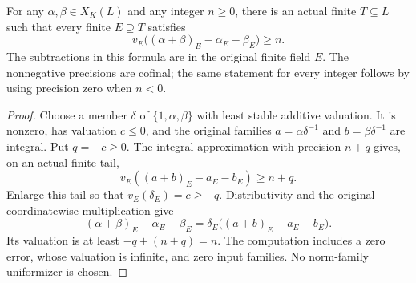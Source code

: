 \begin{lemma}
\label{fw:norm-limit-coordinate-approximation}
\leanok
For any $\alpha,\beta\in X_K(L)$ and any integer $n\geq0$, there is an
actual finite $T\subseteq L$ such that every finite $E\supseteq T$
satisfies
\[
 v_E\bigl((\alpha+\beta)_E-\alpha_E-\beta_E\bigr)\geq n.
\]
The subtractions in this formula are in the original finite field $E$.
The nonnegative precisions are cofinal; the same statement for every integer
follows by using precision zero when $n<0$.
\end{lemma}
\begin{proof}
Choose a member $\delta$ of $\{1,\alpha,\beta\}$ with least
stable additive valuation. It is nonzero, has valuation $c\leq0$,
and the original families $a=\alpha\delta^{-1}$ and
$b=\beta\delta^{-1}$ are integral. Put $q=-c\geq0$.
The integral approximation with precision $n+q$ gives, on an
actual finite tail,
\[
 v_E((a+b)_E-a_E-b_E)\geq n+q.
\]
Enlarge this tail so that $v_E(\delta_E)=c\geq-q$.
Distributivity and the original coordinatewise multiplication give
\[
 (\alpha+\beta)_E-\alpha_E-\beta_E
 =\delta_E\bigl((a+b)_E-a_E-b_E\bigr).
\]
Its valuation is at least $-q+(n+q)=n$. The computation includes a
zero error, whose valuation is infinite, and zero input families.
No norm-family uniformizer is chosen.
\end{proof}

